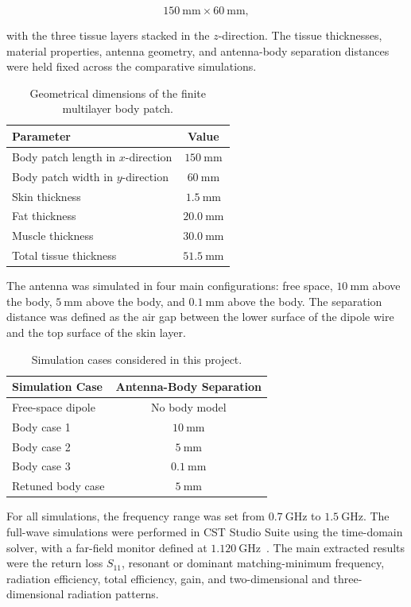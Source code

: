 \[
150~\mathrm{mm} \times 60~\mathrm{mm},
\]

with the three tissue layers stacked in the \(z\)-direction. The tissue thicknesses, material properties, antenna geometry, and antenna-body separation distances were held fixed across the comparative simulations.

\begin{table}[htbp]
\centering
\caption{Geometrical dimensions of the finite multilayer body patch.}
\label{tab:body-geometry}
\begin{tabular}{lc}
\hline
\textbf{Parameter} & \textbf{Value} \\
\hline
Body patch length in \(x\)-direction & \(150~\mathrm{mm}\) \\
Body patch width in \(y\)-direction & \(60~\mathrm{mm}\) \\
Skin thickness & \(1.5~\mathrm{mm}\) \\
Fat thickness & \(20.0~\mathrm{mm}\) \\
Muscle thickness & \(30.0~\mathrm{mm}\) \\
Total tissue thickness & \(51.5~\mathrm{mm}\) \\
\hline
\end{tabular}
\end{table}

The antenna was simulated in four main configurations: free space, \(10~\mathrm{mm}\) above the body, \(5~\mathrm{mm}\) above the body, and \(0.1~\mathrm{mm}\) above the body. The separation distance was defined as the air gap between the lower surface of the dipole wire and the top surface of the skin layer.

\begin{table}[htbp]
\centering
\caption{Simulation cases considered in this project.}
\label{tab:simulation-cases}
\begin{tabular}{lc}
\hline
\textbf{Simulation Case} & \textbf{Antenna-Body Separation} \\
\hline
Free-space dipole & No body model \\
Body case 1 & \(10~\mathrm{mm}\) \\
Body case 2 & \(5~\mathrm{mm}\) \\
Body case 3 & \(0.1~\mathrm{mm}\) \\
Retuned body case & \(5~\mathrm{mm}\) \\
\hline
\end{tabular}
\end{table}

For all simulations, the frequency range was set from \(0.7~\mathrm{GHz}\) to \(1.5~\mathrm{GHz}\). The full-wave simulations were performed in CST Studio Suite using the time-domain solver, with a far-field monitor defined at \(1.120~\mathrm{GHz}\)~\cite{cst2026}. The main extracted results were the return loss \(S_{11}\), resonant or dominant matching-minimum frequency, radiation efficiency, total efficiency, gain, and two-dimensional and three-dimensional radiation patterns.
